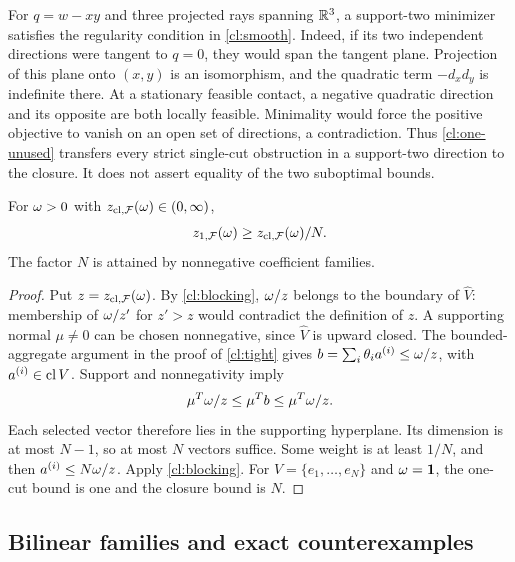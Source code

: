 For $q=w-xy$ and three projected rays spanning $\mathbb R^3$, a support-two
minimizer satisfies the regularity condition in \cref{cl:smooth}.
Indeed, if its two independent directions were tangent to $q=0$, they
would span the tangent plane. Projection of this plane onto $(x,y)$ is
an isomorphism, and the quadratic term $-d_xd_y$ is indefinite there.
At a stationary feasible contact, a negative quadratic direction and its
opposite are both locally feasible. Minimality would force the positive
objective to vanish on an open set of directions, a contradiction.
Thus \cref{cl:one-unused} transfers every strict single-cut obstruction
in a support-two direction to the closure. It does not assert equality
of the two suboptimal bounds.

\begin{proposition}\label{cl:gain}
For $\omega>0$ with $z_{\mathrm{cl},\mathcal F}(\omega)\in(0,\infty)$,
\[
 z_{1,\mathcal F}(\omega)\ge z_{\mathrm{cl},\mathcal F}(\omega)/N.
\]
The factor $N$ is attained by nonnegative coefficient families.
\end{proposition}

\begin{proof}
Put $z=z_{\mathrm{cl},\mathcal F}(\omega)$.
By \cref{cl:blocking}, $\omega/z$ belongs to the boundary of
$\widehat V$: membership of $\omega/z'$ for $z'>z$ would contradict the
definition of $z$. A supporting normal $\mu\ne0$ can be chosen
nonnegative, since $\widehat V$ is upward closed.
The bounded-aggregate argument in the proof of \cref{cl:tight} gives
$b=\sum_i\theta_i a^{(i)}\le\omega/z$, with $a^{(i)}\in\operatorname{cl} V$.
Support and nonnegativity imply
\[
 \mu^T\omega/z\le\mu^Tb\le\mu^T\omega/z.
\]
Each selected vector therefore lies in the supporting hyperplane.
Its dimension is at most $N-1$, so at most $N$ vectors suffice.
Some weight is at least $1/N$, and then
$a^{(i)}\le N\omega/z$. Apply \cref{cl:blocking}.
For $V=\{e_1,\ldots,e_N\}$ and $\omega=\mathbf1$, the one-cut bound is one
and the closure bound is $N$.
\end{proof}

\subsection{Bilinear families and exact counterexamples}\label{cl:bilinear}

